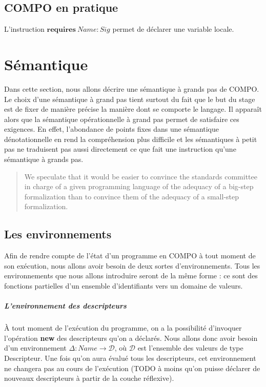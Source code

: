 \documentclass[11pt,a4paper,fleqn]{report}
\begin{document}
\section{COMPO en pratique}
L'instruction $\textbf{requires}~Name : Sig$ permet de déclarer une variable locale.





\chapter{Sémantique}

Dans cette section, nous allons décrire une sémantique à grands pas de COMPO. Le choix d'une sémantique à grand pas tient surtout du fait que le but du stage est de fixer de manière précise la manière dont se comporte le langage. Il apparaît alors que la sémantique opérationnelle à grand pas permet de satisfaire ces exigences\cite{Cha13}. En effet, l'abondance de points fixes dans une sémantique dénotationnelle en rend la compréhension plus difficile et les sémantiques à petit pas ne traduisent pas aussi directement ce que fait une instruction qu'une sémantique à grands pas.

\blockquote{We speculate that it would be easier to convince the standards committee in charge of a given programming language of the adequacy of a big-step formalization than to convince them of the adequacy of a small-step formalization.}{\cite{Cha13}}

\section{Les environnements}
Afin de rendre compte de l'état d'un programme en COMPO à tout moment de son exécution, nous allons avoir besoin de deux sortes d'environnements. Tous les environnements que nous allons introduire seront de la même forme : ce sont des fonctions partielles d'un ensemble d'identifiants vers un domaine de valeurs.

\paragraph{L'environnement des descripteurs}
À tout moment de l'exécution du programme, on a la possibilité d'invoquer l'opération \textbf{new} des descripteurs qu'on a déclarés. Nous allons donc avoir besoin d'un environnement $\Delta : Name \rightarrow \mathcal{D}$, où $\mathcal{D}$ est l'ensemble des valeurs de type Descripteur. Une fois qu'on aura évalué tous les descripteurs, cet environnement ne changera pas au cours de l'exécution (TODO à moins qu'on puisse déclarer de nouveaux descripteurs à partir de la couche réflexive).
\end{document}
